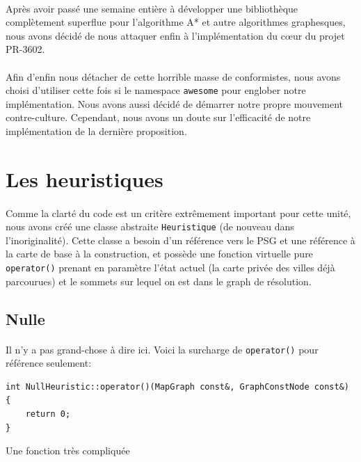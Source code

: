 \documentclass[french]{article}
\begin{document}
\paragraph{} Après avoir passé une semaine entière à développer une
bibliothèque complètement superflue pour l'algorithme A* et autre algorithmes
graphesques, nous avons décidé de nous attaquer enfin à l'implémentation du
cœur du projet PR-3602.

\paragraph{} Afin d'enfin nous détacher de cette horrible masse de
conformistes, nous avons choisi d'utiliser cette fois si le namespace
\texttt{awesome} pour englober notre implémentation. Nous avons aussi décidé de
démarrer notre propre mouvement contre-culture. Cependant, nous avons un doute
sur l'efficacité de notre implémentation de la dernière proposition.

\section{Les heuristiques}

\paragraph{} Comme la clarté du code est un critère extrêmement important pour
cette unité, nous avons créé une classe abstraite \texttt{Heuristique} (de
nouveau dans l'inoriginalité). Cette classe a besoin d'un référence vers le PSG
et une référence à la carte de base à la construction, et possède une fonction
virtuelle pure \texttt{operator()} prenant en paramètre l'état actuel
(la carte privée des villes déjà parcourues) et le sommets sur lequel on est
dans le graph de résolution.

\subsection{Nulle}

\paragraph{} Il n'y a pas grand-chose à dire ici. Voici la surcharge de
\texttt{operator()} pour référence seulement:

\begin{listing}[H]
\begin{verbatim}
int NullHeuristic::operator()(MapGraph const&, GraphConstNode const&) {
	return 0;
}
\end{verbatim}
\caption{Une fonction très compliquée}
\label{tsp:nulloperator}
\end{listing}
\end{document}
